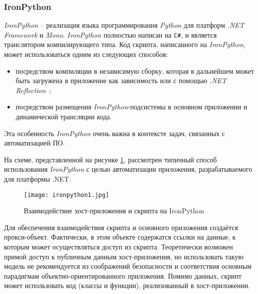 \subsubsection{IronPython}

{\it IronPython} -- реализация языка программирования {\it Python} для платформ {\it .NET Framework} и {\it Mono}. {\it IronPython} полностью написан на {\tt C\#}, и является транслятором компилирующего типа. Код скрипта, написанного на {\it IronPython}, может использоваться одним из следующих способов:
\begin{itemize}
 \item посредством компиляции в независимую сборку, которая в дальнейшем может быть загружена в приложение как зависимость или с помощью {\it .NET Reflection}~\cite{cs2010-dotnet40};
 \item посредством размещения {\it IronPython}-подсистемы в основном приложении и динамической трансляции кода.
\end{itemize}

Эта особенность {\it IronPython} очень важна в контексте задач, связанных с автоматизацией ПО.

На схеме, представленной на рисунке \ref{ironpython-scheme}, рассмотрен типичный способ использования {\it IronPython} с целью автоматизации приложения, разрабатываемого для платформы .NET:

\begin{figure}[!h]
    \centering
    \texttt{[image: ironpython1.jpg]}
    \caption{Взаимодействие хост-приложения и скрипта на IronPython}
    \label{ironpython-scheme}
\end{figure}

Для обеспечения взаимодействия скрипта и основного приложения создаётся прокси-объект. Фактически, в этом объекте содержатся ссылки на данные, к которым может осуществляться доступ из скрипта. Теоретически возможен примой доступ к публичным данным хост-приложения, но использовать такую модель не рекомендуется из соображений безопасности и соответствия основным парадигмам объектно-ориентированного приложения. Помимо данных, скрипт может использовать код (классы и функции), реализованный в хост-приложении.